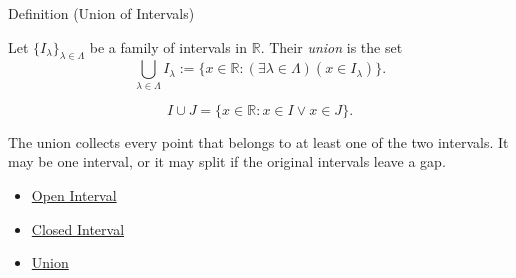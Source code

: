 \begin{definitionbox}{Definition (Union of Intervals)}
\begin{definition}
\label{def:union-of-intervals}
Let $\{I_\lambda\}_{\lambda\in\Lambda}$ be a family of intervals in
$\mathbb{R}$.  Their \emph{union} is the set
\[
  \bigcup_{\lambda\in\Lambda}I_\lambda
  :=
  \{x\in\mathbb{R}:(\exists\lambda\in\Lambda)(x\in I_\lambda)\}.
\]
\end{definition}
\end{definitionbox}

\begin{remark*}
\[
I\cup J=\{x\in\mathbb{R}:x\in I\lor x\in J\}.
\]
\end{remark*}

\begin{remark*}[Interpretation]
The union collects every point that belongs to at least one of the two
intervals. It may be one interval, or it may split if the original intervals
leave a gap.
\end{remark*}

\begin{dependencies}
\begin{itemize}
  \item \hyperref[def:open-interval]{Open Interval}
  \item \hyperref[def:closed-interval]{Closed Interval}
  \item \hyperref[def:union]{Union}
\end{itemize}
\end{dependencies}
